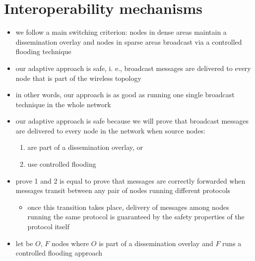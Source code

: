 
\section{Interoperability mechanisms}

\label{sec:mechanisms}
\begin{itemize}
	\item we follow a main switching criterion: nodes in dense areas maintain a dissemination overlay and nodes in sparse areas broadcast via a controlled flooding technique 
	\item our adaptive approach is safe, i. e., broadcast messages are delivered to every node that is part of the wireless topology 
	\item in other words, our approach is as good as running one single broadcast technique in the whole network 
	\item our adaptive approach is safe because we will prove that broadcast messages are delivered to every node in the network when source nodes: 
	\begin{enumerate}
		\item are part of a dissemination overlay, or
		\item use controlled flooding
	\end{enumerate}
	\item prove 1 and 2 is equal to prove that messages are correctly forwarded when messages transit between any pair of nodes running different protocols 
	\begin{itemize}
		\item once this transition takes place, delivery of messages among nodes running the same protocol is guaranteed by the safety properties of the protocol itself
	\end{itemize}
	\item let be $O$, $F$ nodes where $O$ is part of a dissemination overlay and $F$ runs a controlled flooding approach 

\end{itemize}
